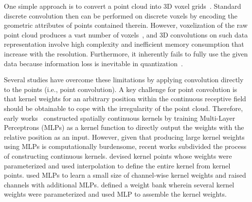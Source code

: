 \documentclass[preprint,12pt]{elsarticle}
\begin{document}
One simple approach is to convert a point cloud into 3D voxel grids~\cite{wu20153d,tchapmi2017segcloud,graham20183d}. Standard discrete convolution then can be performed on discrete voxels by encoding the geometric attributes of points contained therein. However, voxelization of the raw point cloud produces a vast number of voxels~\citep{qi2017pointnet}, and 3D convolutions on such data representation involve high complexity and inefficient memory consumption that increase with the resolution. Furthermore, it inherently fails to fully use the given data because information loss is inevitable in quantization~\citep{qi2017pointnet,liu2019relation,jiang2018pointsift}. 
\begin{comment}
	To overcome these limitations, the raw point cloud needs to be processed without intermediate data representation. For direct processing, PointNet~\citep{qi2017pointnet} proposes to learn pointwise features with shared multi-layer perceptron (MLP) and symmetric aggregation function to be immune to point order ambiguity. Due to its simple but powerful description ability, this approach has become recognized, adopted, and improved by following works as a basic concept for point cloud analysis~\citep{qi2017pointnet++,zhao2019pointweb,jiang2018pointsift,joseph2019momen,engelmann2018know,zhang2019shellnet,hu2020randla,yang2019modeling}. 
\end{comment}



Several studies have overcome these limitations by applying convolution directly to the points (i.e., point convolution). A key challenge for point convolution is that kernel weights for an arbitrary position within the continuous receptive field should be obtainable to cope with the irregularity of the point cloud. Therefore, early works~\citep{hermosilla2018monte,wu2019pointconv} constructed spatially continuous kernels by training Multi-Layer Perceptrons (MLPs) as a kernel function to directly output the weights with the relative position as an input. However, given that producing large kernel weights using MLPs is computationally burdensome, recent works subdivided the process of constructing continuous kernels. \cite{boulch2019generalizing,boulch2020convpoint,thomas2019kpconv} devised kernel points whose weights were parameterized and used interpolation to define the entire kernel from kernel points. \cite{liu2019relation} used MLPs to learn a small size of channel-wise kernel weights and raised channels with additional MLPs. \cite{xu2021paconv} defined a weight bank wherein several kernel weights were parameterized and used MLP to assemble the kernel weights.
\end{document}

